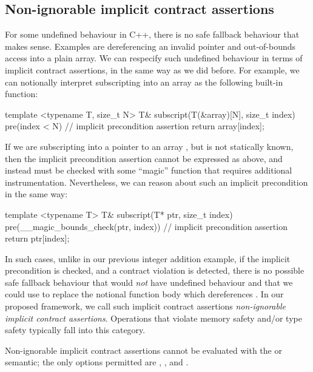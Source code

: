 \subsection{Non-ignorable implicit contract assertions}

For some undefined behaviour in C++, there is no safe fallback behaviour that makes sense. Examples are dereferencing an invalid pointer and out-of-bounds access into a plain array. We can respecify such undefined behaviour in terms of implicit contract assertions, in the same way as we did before. For example, we can notionally interpret subscripting into an array as the following built-in function:
\begin{codeblock}
template <typename T, size_t N>
T& subscript(T(&array)[N], size_t index) 
pre(index < N) {  // implicit precondition assertion
  return array[index];
}
\end{codeblock}
If we are subscripting into a pointer  to an array , but  is not statically known, then the implicit precondition assertion cannot be expressed as above, and instead must be checked with some ``magic'' function that requires additional instrumentation. Nevertheless, we can reason about such an implicit precondition in the same way:
\begin{codeblock}
template <typename T>
T& subscript(T* ptr, size_t index) 
pre(__magic_bounds_check(ptr, index)) {  // implicit precondition assertion
  return ptr[index];
}
\end{codeblock}
In such cases, unlike in our previous integer addition example, if the implicit precondition is checked, and a contract violation is detected, there is no possible safe fallback behaviour that would \emph{not} have undefined behaviour and that we could use to replace the notional function body which dereferences . In our proposed framework, we call such implicit contract assertions \emph{non-ignorable implicit contract assertions}. Operations that violate memory safety and/or type safety typically fall into this category.

Non-ignorable implicit contract assertions cannot be evaluated with the  or  semantic; the only options permitted are , , and .

